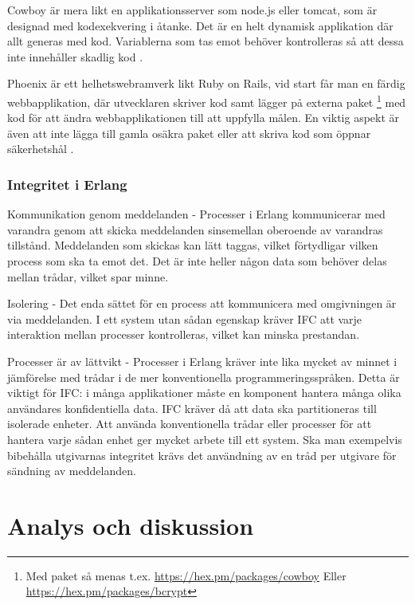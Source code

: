 \documentclass[12pt]{article}
\begin{document}
Cowboy är mera likt en applikationsserver som node.js eller tomcat, som är designad med kodexekvering i åtanke. Det är en helt dynamisk applikation där allt generas med kod. Variablerna som tas emot behöver kontrolleras så att dessa inte innehåller skadlig kod
\cite{cowboy}.

Phoenix är ett helhetswebramverk likt Ruby on Rails, vid start får man en färdig webbapplikation, där utvecklaren skriver kod samt lägger på externa paket
\footnote{Med paket så menas t.ex.
\url{https://hex.pm/packages/cowboy} Eller \url{https://hex.pm/packages/bcrypt} } med kod för att ändra webbapplikationen till att uppfylla målen. En viktig aspekt är även att inte lägga till gamla osäkra paket eller att skriva kod som öppnar säkerhetshål \cite{phoenix/ruby,phoenix/rails,phoenix}.




\subsubsection*{Integritet i Erlang } 
Kommunikation genom meddelanden - Processer i Erlang kommunicerar med varandra genom att skicka meddelanden sinsemellan oberoende av varandras tillstånd.
 Meddelanden som skickas kan lätt taggas, vilket förtydligar vilken process som ska ta emot det.
 Det är inte heller någon data som behöver delas mellan trådar, vilket spar minne.

Isolering - Det enda sättet för en process att kommunicera med omgivningen är via meddelanden.
 I ett system utan sådan egenskap kräver IFC att varje interaktion mellan processer kontrolleras, vilket kan minska prestandan.
 
 Processer är av lättvikt - Processer i Erlang kräver inte lika mycket av minnet i jämförelse med trådar i de mer konventionella programmeringsspråken. Detta är viktigt för IFC: i många applikationer måste en komponent hantera många olika användares konfidentiella data. IFC kräver då att data ska partitioneras till isolerade enheter.
 Att använda konventionella trådar eller processer för att hantera varje sådan enhet ger mycket arbete till ett system. Ska man exempelvis bibehålla utgivarnas integritet krävs det användning av en tråd per utgivare för sändning av meddelanden.
 \cite{IFC}



\section{	Analys och diskussion}
\end{document}
